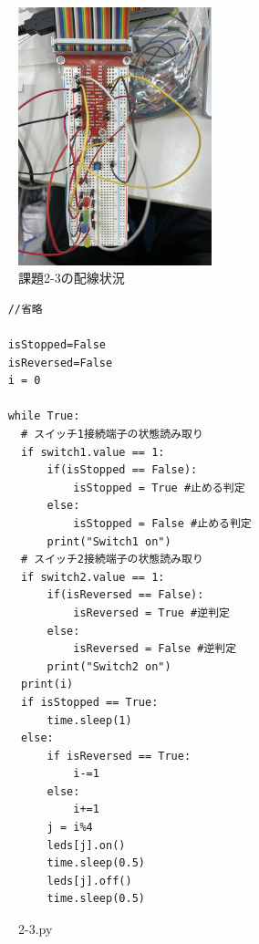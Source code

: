 \documentclass{ltjsarticle} %
\begin{document}
\begin{figure}[H] %
  \centering
  \includegraphics[width=0.5\textwidth]{raspi2-3.JPEG} %
  \caption{課題2-3の配線状況} %
  \label{fig:raspi2-3} %
\end{figure}

\begin{mdframed}
  \begin{verbatim}
    //省略

    isStopped=False
    isReversed=False
    i = 0

    while True:      
      # スイッチ1接続端⼦の状態読み取り
      if switch1.value == 1:
          if(isStopped == False):
              isStopped = True #止める判定
          else:
              isStopped = False #止める判定        
          print("Switch1 on")
      # スイッチ2接続端⼦の状態読み取り    
      if switch2.value == 1: 
          if(isReversed == False):
              isReversed = True #逆判定
          else:
              isReversed = False #逆判定
          print("Switch2 on")
      print(i)     
      if isStopped == True:
          time.sleep(1)
      else:
          if isReversed == True: 
              i-=1
          else:
              i+=1
          j = i%4   
          leds[j].on()                    
          time.sleep(0.5) 
          leds[j].off()                    
          time.sleep(0.5) 	
  \end{verbatim}
  \end{mdframed}
  \begin{figure}[H]
  \caption{2-3.py}
  \label{fig:2-3py}
  \end{figure}
\end{document}
